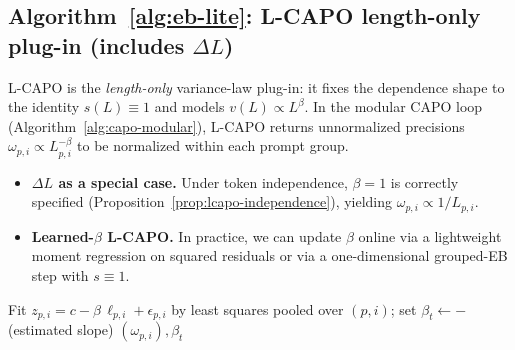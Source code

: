 \subsection{Algorithm~\ref{alg:eb-lite}: L-CAPO length-only plug-in (includes $\Delta L$)}
L-CAPO is the \emph{length-only} variance-law plug-in: it fixes the dependence shape to the identity $s(L)\equiv 1$ and models $v(L)\propto L^{\beta}$. In the modular CAPO loop (Algorithm~\ref{alg:capo-modular}), L-CAPO returns unnormalized precisions $\omega_{p,i}\propto L_{p,i}^{-\beta}$ to be normalized within each prompt group.
\begin{itemize}
  \item \textbf{$\Delta L$ as a special case.} Under token independence, $\beta=1$ is correctly specified (Proposition~\ref{prop:lcapo-independence}), yielding $\omega_{p,i}\propto 1/L_{p,i}$.
  \item \textbf{Learned-$\beta$ L-CAPO.} In practice, we can update $\beta$ online via a lightweight moment regression on squared residuals or via a one-dimensional grouped-EB step with $s\equiv 1$.
\end{itemize}

\begin{algorithm}
\DontPrintSemicolon
\caption{L-CAPO plug-in: length-only precisions (optionally fit $\beta$)}
\label{alg:eb-lite}


Fit $z_{p,i}=c-\beta\,\ell_{p,i}+\epsilon_{p,i}$ by least squares pooled over $(p,i)$; set $\beta_t\gets -$ (estimated slope)\;
\Return $(\omega_{p,i}),\beta_t$\;
\end{algorithm}

